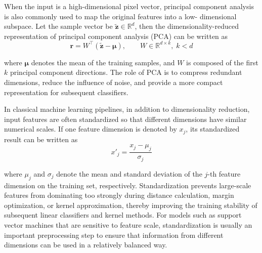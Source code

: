 \par When the input is a high-dimensional pixel vector, principal component
analysis is also commonly used to map the original features into a low-
dimensional subspace. Let the sample vector be
$\tilde{\mathbf{z}}\in\mathbb{R}^{d}$, then the dimensionality-reduced
representation of principal component analysis (PCA)
\cite{perry2025inference,zheng2021application} can be written as
\begin{equation}
    \mathbf{r}=W^\top(\tilde{\mathbf{z}}-\boldsymbol{\mu}),\qquad
    W\in\mathbb{R}^{d\times k},\; k<d
    \label{eq:pca-basic}
\end{equation}
\par where $\boldsymbol{\mu}$ denotes the mean of the training samples, and $W$
is composed of the first $k$ principal component directions. The role of PCA is
to compress redundant dimensions, reduce the influence of noise, and provide a
more compact representation for subsequent classifiers.

\par In classical machine learning pipelines, in addition to dimensionality
reduction, input features are often standardized so that different dimensions
have similar numerical scales. If one feature dimension is denoted by $x_j$,
its standardized result can be written as
\begin{equation}
    x'_j=\frac{x_j-\mu_j}{\sigma_j}
    \label{eq:standardization-basic}
\end{equation}
\par where $\mu_j$ and $\sigma_j$ denote the mean and standard deviation of the
$j$-th feature dimension on the training set, respectively. Standardization
prevents large-scale features from dominating too strongly during distance
calculation, margin optimization, or kernel approximation, thereby improving
the training stability of subsequent linear classifiers and kernel methods. For
models such as support vector machines that are sensitive to feature scale,
standardization is usually an important preprocessing step to ensure that
information from different dimensions can be used in a relatively balanced way.

